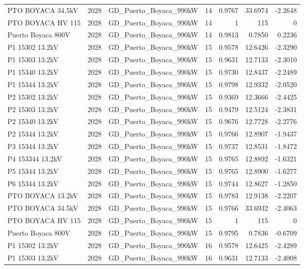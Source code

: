 \documentclass[11pt,a4paper]{article}
\begin{document}
\begin{longtable}{llllrrr}
PTO BOYACA 34.5kV & 2028 & GD\_Puerto\_Boyaca\_990kW & 14 & 0.9767 & 33.6974 & -2.2648 \\
PTO BOYACA HV 115 & 2028 & GD\_Puerto\_Boyaca\_990kW & 14 & 1 & 115 & 0 \\
Puerto Boyaca 800V & 2028 & GD\_Puerto\_Boyaca\_990kW & 14 & 0.9813 & 0.7850 & 0.2236 \\
P1 15302 13.2kV & 2028 & GD\_Puerto\_Boyaca\_990kW & 15 & 0.9578 & 12.6426 & -2.3290 \\
P1 15303 13.2kV & 2028 & GD\_Puerto\_Boyaca\_990kW & 15 & 0.9631 & 12.7133 & -2.3010 \\
P1 15340 13.2kV & 2028 & GD\_Puerto\_Boyaca\_990kW & 15 & 0.9730 & 12.8437 & -2.2489 \\
P1 15344 13.2kV & 2028 & GD\_Puerto\_Boyaca\_990kW & 15 & 0.9798 & 12.9332 & -2.0520 \\
P2 15302 13.2kV & 2028 & GD\_Puerto\_Boyaca\_990kW & 15 & 0.9369 & 12.3666 & -2.4425 \\
P2 15303 13.2kV & 2028 & GD\_Puerto\_Boyaca\_990kW & 15 & 0.9479 & 12.5124 & -2.3831 \\
P2 15340 13.2kV & 2028 & GD\_Puerto\_Boyaca\_990kW & 15 & 0.9676 & 12.7728 & -2.2776 \\
P2 15344 13.2kV & 2028 & GD\_Puerto\_Boyaca\_990kW & 15 & 0.9766 & 12.8907 & -1.9437 \\
P3 15344 13.2kV & 2028 & GD\_Puerto\_Boyaca\_990kW & 15 & 0.9737 & 12.8531 & -1.8472 \\
P4 153344 13.2kV & 2028 & GD\_Puerto\_Boyaca\_990kW & 15 & 0.9765 & 12.8892 & -1.6321 \\
P5 15344 13.2kV & 2028 & GD\_Puerto\_Boyaca\_990kW & 15 & 0.9765 & 12.8900 & -1.6277 \\
P6 15344 13.2kV & 2028 & GD\_Puerto\_Boyaca\_990kW & 15 & 0.9744 & 12.8627 & -1.2850 \\
PTO BOYACA 13.2kV & 2028 & GD\_Puerto\_Boyaca\_990kW & 15 & 0.9783 & 12.9138 & -2.2207 \\
PTO BOYACA 34.5kV & 2028 & GD\_Puerto\_Boyaca\_990kW & 15 & 0.9766 & 33.6932 & -2.4063 \\
PTO BOYACA HV 115 & 2028 & GD\_Puerto\_Boyaca\_990kW & 15 & 1 & 115 & 0 \\
Puerto Boyaca 800V & 2028 & GD\_Puerto\_Boyaca\_990kW & 15 & 0.9795 & 0.7836 & -0.6709 \\
P1 15302 13.2kV & 2028 & GD\_Puerto\_Boyaca\_990kW & 16 & 0.9578 & 12.6425 & -2.4289 \\
P1 15303 13.2kV & 2028 & GD\_Puerto\_Boyaca\_990kW & 16 & 0.9631 & 12.7133 & -2.4008 \\

\end{longtable}
\end{document}
